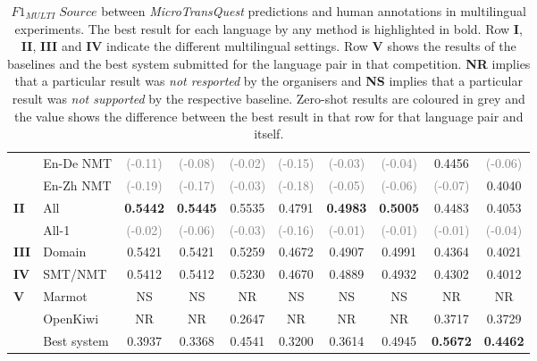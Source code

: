 \begin{table}[t]
\begin{center}
{\begin{tabular}{l l c c c c c c c c}
				& En-De NMT & \textcolor{gray}{(-0.11)}  & \textcolor{gray}{(-0.08)} & \textcolor{gray}{(-0.02)} & \textcolor{gray}{(-0.15)} & \textcolor{gray}{(-0.03)}  & \textcolor{gray}{(-0.04)} & 0.4456 &  \textcolor{gray}{(-0.06)} \\
				& En-Zh NMT & \textcolor{gray}{(-0.19)}  & \textcolor{gray}{(-0.17)} & \textcolor{gray}{(-0.03)} & \textcolor{gray}{(-0.18)} & \textcolor{gray}{(-0.05)}  & \textcolor{gray}{(-0.06)} & \textcolor{gray}{(-0.07)} & 0.4040 \\
				\midrule
				\multirow{2}{*}{\bf II} & All & \textbf{0.5442}  & \textbf{0.5445} & 0.5535 & 0.4791 & \textbf{0.4983} & \textbf{0.5005} & 0.4483 & 0.4053\\
				& All-1 & \textcolor{gray}{(-0.02)}  & \textcolor{gray}{(-0.06)} & \textcolor{gray}{(-0.03)} & \textcolor{gray}{(-0.16)} & \textcolor{gray}{(-0.01)} & \textcolor{gray}{(-0.01)} & \textcolor{gray}{(-0.01)} & \textcolor{gray}{(-0.04)} \\
				\midrule
				\multirow{1}{*}{\bf III} & Domain & 0.5421  & 0.5421 & 0.5259 & 0.4672 & 0.4907 & 0.4991  & 0.4364 &  0.4021 \\
				\midrule
				\multirow{1}{*}{\bf IV} & SMT/NMT & 0.5412   & 0.5412 & 0.5230 & 0.4670 & 0.4889 & 0.4932 & 0.4302 & 0.4012 \\
				\midrule
				\multirow{3}{*}{\bf V} & Marmot & NS  & NS & NR & NS & NS & NS & NR & NR \\
				& OpenKiwi & NR  & NR & 0.2647 & NR & NR & NR & 0.3717 & 0.3729 \\
				& Best system & 0.3937  & 0.3368  & 0.4541 & 0.3200 & 0.3614 & 0.4945 & \textbf{0.5672} & \textbf{0.4462} \\
				\bottomrule
			\end{tabular}
		}
	\end{center}
	\caption[$F1_{\textit{MULTI}} \; Source$ between MicroTransQuest predictions and human annotations in multilingual experiments.]{$F1_{\textit{MULTI}} \; Source$ between \textit{MicroTransQuest} predictions and human annotations in multilingual experiments. The best result for each language by any method is highlighted in bold. Row \textbf{I}, \textbf{II}, \textbf{III} and \textbf{IV} indicate the different multilingual settings. Row \textbf{V} shows the results of the baselines and the best system submitted for the language pair in that competition. \textbf{NR} implies that a particular result was \textit{not resported} by the organisers and \textbf{NS} implies that a particular result was \textit{not supported} by the respective baseline. Zero-shot results are coloured in grey and the value shows the difference between the best result in that row for that language pair and itself.} 
	\label{tab:multilingual_source_prediction}
\end{table}


